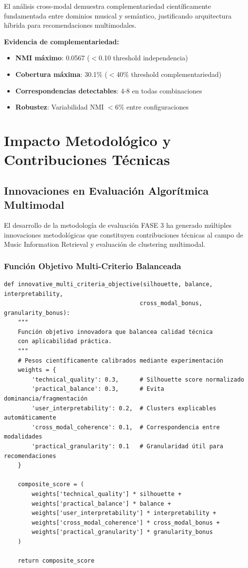\documentclass[12pt,a4paper]{article}
\begin{document}
El análisis cross-modal demuestra complementariedad científicamente fundamentada entre dominios musical y semántico, justificando arquitectura híbrida para recomendaciones multimodales.

\textbf{Evidencia de complementariedad:}
\begin{itemize}
    \item \textbf{NMI máximo}: 0.0567 ($<$0.10 threshold independencia)
    \item \textbf{Cobertura máxima}: 30.1\% ($<$40\% threshold complementariedad)
    \item \textbf{Correspondencias detectables}: 4-8 en todas combinaciones
    \item \textbf{Robustez}: Variabilidad NMI $<$6\% entre configuraciones
\end{itemize}

\section{Impacto Metodológico y Contribuciones Técnicas}

\subsection{Innovaciones en Evaluación Algorítmica Multimodal}

El desarrollo de la metodología de evaluación FASE 3 ha generado múltiples innovaciones metodológicas que constituyen contribuciones técnicas al campo de Music Information Retrieval y evaluación de clustering multimodal.

\subsubsection{Función Objetivo Multi-Criterio Balanceada}

\begin{lstlisting}[caption={Función Objetivo Innovadora Multi-Criterio}]
def innovative_multi_criteria_objective(silhouette, balance, interpretability,
                                       cross_modal_bonus, granularity_bonus):
    """
    Función objetivo innovadora que balancea calidad técnica
    con aplicabilidad práctica.
    """
    # Pesos científicamente calibrados mediante experimentación
    weights = {
        'technical_quality': 0.3,      # Silhouette score normalizado
        'practical_balance': 0.3,      # Evita dominancia/fragmentación
        'user_interpretability': 0.2,  # Clusters explicables automáticamente
        'cross_modal_coherence': 0.1,  # Correspondencia entre modalidades
        'practical_granularity': 0.1   # Granularidad útil para recomendaciones
    }

    composite_score = (
        weights['technical_quality'] * silhouette +
        weights['practical_balance'] * balance +
        weights['user_interpretability'] * interpretability +
        weights['cross_modal_coherence'] * cross_modal_bonus +
        weights['practical_granularity'] * granularity_bonus
    )

    return composite_score
\end{lstlisting}
\end{document}

